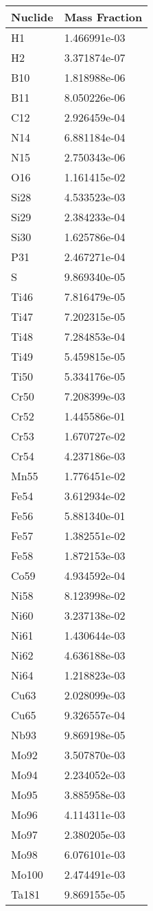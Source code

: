 \begin{centering}
\begin{longtable}[ht!]
{ p{} | p{} }
\hline
Nuclide & Mass Fraction\\
\hline
H1 & 1.466991e-03\\
H2 & 3.371874e-07\\
B10 & 1.818988e-06\\
B11 & 8.050226e-06\\
C12 & 2.926459e-04\\
N14 & 6.881184e-04\\
N15 & 2.750343e-06\\
O16 & 1.161415e-02\\
Si28 & 4.533523e-03\\
Si29 & 2.384233e-04\\
Si30 & 1.625786e-04\\
P31 & 2.467271e-04\\
S & 9.869340e-05\\
Ti46 & 7.816479e-05\\
Ti47 & 7.202315e-05\\
Ti48 & 7.284853e-04\\
Ti49 & 5.459815e-05\\
Ti50 & 5.334176e-05\\
Cr50 & 7.208399e-03\\
Cr52 & 1.445586e-01\\
Cr53 & 1.670727e-02\\
Cr54 & 4.237186e-03\\
Mn55 & 1.776451e-02\\
Fe54 & 3.612934e-02\\
Fe56 & 5.881340e-01\\
Fe57 & 1.382551e-02\\
Fe58 & 1.872153e-03\\
Co59 & 4.934592e-04\\
Ni58 & 8.123998e-02\\
Ni60 & 3.237138e-02\\
Ni61 & 1.430644e-03\\
Ni62 & 4.636188e-03\\
Ni64 & 1.218823e-03\\
Cu63 & 2.028099e-03\\
Cu65 & 9.326557e-04\\
Nb93 & 9.869198e-05\\
Mo92 & 3.507870e-03\\
Mo94 & 2.234052e-03\\
Mo95 & 3.885958e-03\\
Mo96 & 4.114311e-03\\
Mo97 & 2.380205e-03\\
Mo98 & 6.076101e-03\\
Mo100 & 2.474491e-03\\
Ta181 & 9.869155e-05\\


\end{longtable}
\end{centering}

